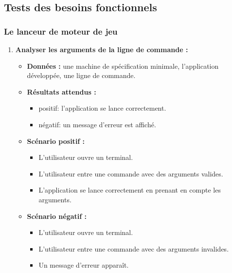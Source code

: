 \subsection{Tests des besoins fonctionnels}

\subsubsection{Le lanceur de moteur de jeu}

\begin{enumerate}
    \item \textbf{Analyser les arguments de la ligne de commande :}
    \begin{itemize}
        \item \textbf{Données :} une machine de spécification minimale, l'application développée, une ligne de commande.
        \item \textbf{Résultats attendus :} 
        \begin{itemize}
            \item positif: l'application se lance correctement. \item négatif: un message d'erreur est affiché.
        \end{itemize}
        \item \textbf{Scénario positif :}
        \begin{itemize}
            \item L’utilisateur ouvre un terminal.
            \item L’utilisateur entre une commande avec des arguments valides.
            \item L'application se lance correctement en prenant en compte les arguments.
        \end{itemize}
        \item \textbf{Scénario négatif :}
        \begin{itemize}
            \item L’utilisateur ouvre un terminal.
            \item L’utilisateur entre une commande avec des arguments invalides.
            \item Un message d'erreur apparaît.
        \end{itemize}
    \end{itemize}
    

\end{enumerate}
